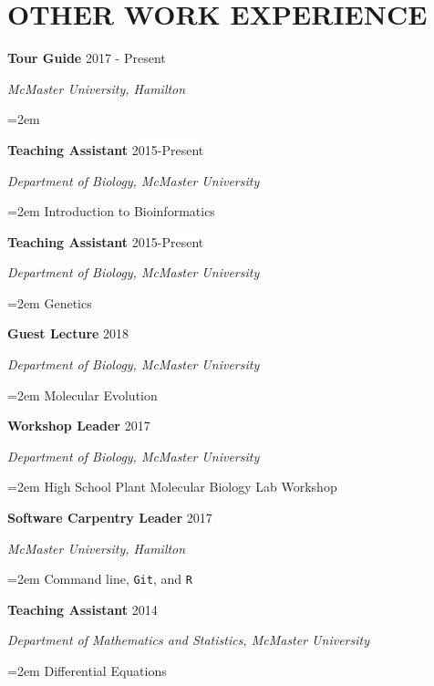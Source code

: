 \documentclass[paper=a4,fontsize=11pt]{scrartcl}	 			%
\newcommand{\NewPart}[1]{\section*{\uppercase{#1}}}
\newcommand{\EducationEntry}[4]{
		\noindent \textbf{#1} \hfill 					%
		\colorbox{White}{%
			\parbox{10em}{%
			\hfill\color{Black}#2}} \par				%
		\noindent \textit{#3} \par					%
		\noindent\hangindent=2em\hangafter=0 \small #4 	%
		\normalsize \par}
\newcommand{\WorkEntry}[4]{						%
		\noindent \textbf{#1} \hfill 					%
		\colorbox{White}{\color{Black}#2} \par		%
		\noindent \textit{#3} \par					%
		\noindent\hangindent=2em\hangafter=0 \small #4 	%
		\normalsize \par}
\begin{document}

%
\NewPart{Other Work Experience}{}
\WorkEntry{Tour Guide}{2017 - Present}{McMaster University, Hamilton}{}
\WorkEntry{Teaching Assistant}{2015-Present}{Department of Biology, McMaster University}{Introduction to Bioinformatics}
\WorkEntry{Teaching Assistant}{2015-Present}{Department of Biology, McMaster University}{Genetics}
\WorkEntry{Guest Lecture}{2018}{Department of Biology, McMaster University}{Molecular Evolution}
\WorkEntry{Workshop Leader}{2017}{Department of Biology, McMaster University}{High School Plant Molecular Biology Lab Workshop}
\WorkEntry{Software Carpentry Leader}{2017}{McMaster University, Hamilton}{Command line, \texttt{Git}, and \texttt{R}}
\WorkEntry{Teaching Assistant}{2014}{Department of Mathematics and Statistics, McMaster University}{Differential Equations}
\end{document}
